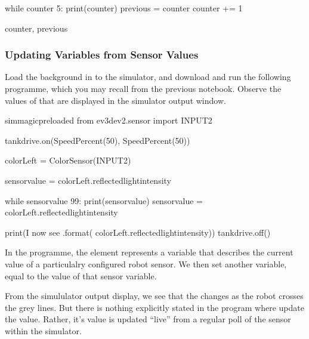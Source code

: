 \documentclass[letterpaper,10pt,english]{sphinxmanual}
\begin{document}
{{\begin{sphinxVerbatim}[commandchars=\\\{\}]
while counter \PYGZlt{} 5:
    print(counter)
    previous = counter
    counter += 1

counter, previous
\end{sphinxVerbatim}
}


\subsubsection{Updating Variables from Sensor Values}
\label{\detokenize{content/01_Robot_Lab/Section_00_02:Updating-Variables-from-Sensor-Values}}
Load the  background in to the simulator, and download and run the following programme, which you may recall from the previous notebook. Observe the values of that are displayed in the simulator output window.

{
\begin{sphinxVerbatim}[commandchars=\\\{\}]
\llap{\color{nbsphinxin}[ ]:\,\hspace{\fboxrule}\hspace{\fboxsep}}\PYGZpc{}\PYGZpc{}sim\PYGZus{}magic\PYGZus{}preloaded
from ev3dev2.sensor import INPUT\PYGZus{}2

tank\PYGZus{}drive.on(SpeedPercent(50), SpeedPercent(50))

colorLeft = ColorSensor(INPUT\PYGZus{}2)

sensor\PYGZus{}value = colorLeft.reflected\PYGZus{}light\PYGZus{}intensity

while sensor\PYGZus{}value \PYGZgt{} 99:
    print(sensor\PYGZus{}value)
    sensor\PYGZus{}value = colorLeft.reflected\PYGZus{}light\PYGZus{}intensity

print(\PYGZdq{}I now see \PYGZob{}\PYGZcb{}\PYGZdq{}.format( colorLeft.reflected\PYGZus{}light\PYGZus{}intensity))
tank\PYGZus{}drive.off()
\end{sphinxVerbatim}
}

In the programme, the  element represents a variable that describes the current value of a particulalry configured robot sensor. We then set another variable, equal to the value of that sensor variable.

From the simululator output display, we see that the  changes as the robot crosses the grey lines. But there is nothing explicitly stated in the program where  update the  value. Rather, it’s value is updated “live” from a regular poll of the sensor within the simulator.

}
\end{document}

